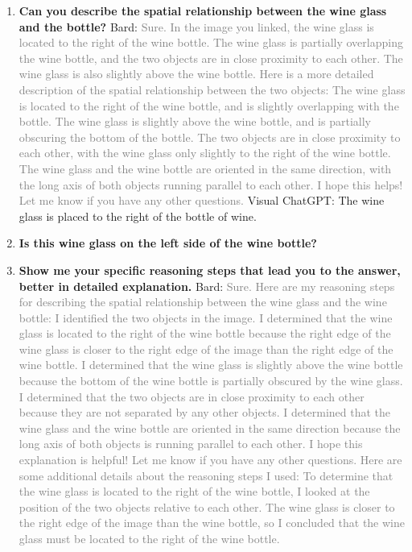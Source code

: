     \begin{enumerate}
        \item \textbf{Can you describe the spatial relationship between the wine glass and the bottle?}
        \subitem Bard: \textcolor{gray}{
        Sure. In the image you linked, the wine glass is located to the right of the wine bottle. The wine glass is partially overlapping the wine bottle, and the two objects are in close proximity to each other. The wine glass is also slightly above the wine bottle.
        Here is a more detailed description of the spatial relationship between the two objects:
        The wine glass is located to the right of the wine bottle, and is slightly overlapping with the bottle.
        The wine glass is slightly above the wine bottle, and is partially obscuring the bottom of the bottle.
        The two objects are in close proximity to each other, with the wine glass only slightly to the right of the wine bottle.
        The wine glass and the wine bottle are oriented in the same direction, with the long axis of both objects running parallel to each other.
        I hope this helps! Let me know if you have any other questions.}
        \subitem Visual ChatGPT: The wine glass is placed to the right of the bottle of wine.
        \item \textbf{Is this wine glass on the left side of the wine bottle?}
        \item \textbf{Show me your specific reasoning steps that lead you to the answer, better in detailed explanation.}
        \subitem Bard: \textcolor{gray}{Sure. Here are my reasoning steps for describing the spatial relationship between the wine glass and the wine bottle:
        I identified the two objects in the image.
        I determined that the wine glass is located to the right of the wine bottle because the right edge of the wine glass is closer to the right edge of the image than the right edge of the wine bottle.
        I determined that the wine glass is slightly above the wine bottle because the bottom of the wine bottle is partially obscured by the wine glass.
        I determined that the two objects are in close proximity to each other because they are not separated by any other objects.
        I determined that the wine glass and the wine bottle are oriented in the same direction because the long axis of both objects is running parallel to each other.
        I hope this explanation is helpful! Let me know if you have any other questions.
        Here are some additional details about the reasoning steps I used:
        To determine that the wine glass is located to the right of the wine bottle, I looked at the position of the two objects relative to each other. The wine glass is closer to the right edge of the image than the wine bottle, so I concluded that the wine glass must be located to the right of the wine bottle.
}
\end{enumerate}
